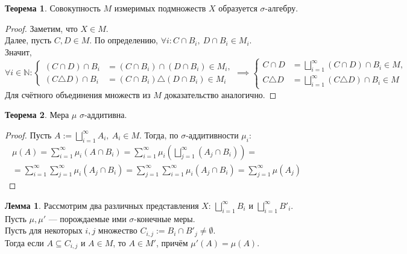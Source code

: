 \documentclass[11pt,a4paper]{report}
\def\Natural{\mathbb{N}}
\theoremstyle{definition}
\theoremstyle{definition}
\newtheorem{theorem}{Теорема}[section]
\newtheorem{lemma}{Лемма}[section]
\theoremstyle{definition}
\begin{document}
	\begin{theorem}
		Совокупность $ M $ измеримых подмножеств $ X $ образуется $ \sigma $-алгебру.
	\end{theorem}
	\begin{proof}
		Заметим, что $ X \in M $.\\
		Далее, пусть $ C, D \in M $. По определению, $ \forall i: C \cap B_{i},\ D \cap B_{i} \in M_{i} $.\\
		Значит, 
		\[\forall i \in \Natural:  
		\begin{cases} 
			(C \cap D) \cap B_{i} &= (C \cap B_{i}) \cap (D \cap B_{i}) \in M_{i},\\
			(C \triangle D) \cap B_{i} &= (C \cap B_{i}) \triangle (D \cap B_{i}) \in M_{i}
		\end{cases} \implies 
		\begin{cases}
			C \cap D &= \bigsqcup\limits_{i=1}^{\infty}{(C \cap D) \cap B_{i}} \in M,\\
			C \triangle D &= \bigsqcup\limits_{i=1}^{\infty}{(C \triangle D) \cap B_{i}} \in M
		\end{cases} \]
	 Для счётного объединения множеств из $ M $ доказательство аналогично.
	\end{proof}
	\begin{theorem}
		Мера $ \mu $ $ \sigma $-аддитивна.
	\end{theorem}
	\begin{proof}
		Пусть $ A := \bigsqcup\limits_{i=1}^{\infty}{A_{i}},\ A_{i} \in M $. Тогда, по $ \sigma $-аддитивности $ \mu_{i} $:
		\begin{gather*}
			\mu(A) = \sum_{i=1}^{\infty}\mu_{i}(A \cap B_{i}) = \sum_{i=1}^{\infty}\mu_{i}\left (\bigsqcup\limits_{j=1}^{\infty}{(A_{j} \cap B_{i})}\right ) =\\= \sum_{i=1}^{\infty}\sum\limits_{j=1}^{\infty}{\mu_{i}(A_{j} \cap B_{i})} = \sum_{j=1}^{\infty}\sum\limits_{i=1}^{\infty}{\mu_{i}(A_{j} \cap B_{i})} = \sum_{j=1}^{\infty}{\mu(A_{j})}
		\end{gather*}
	\end{proof}
	\begin{lemma}
		Рассмотрим два различных представления $ X $: $ \bigsqcup_{i=1}^{\infty}{B_{i}} $ и $ \bigsqcup_{i=1}^{\infty}{B'_{i}} $.\\
		Пусть $ \mu, \mu' $ — порождаемые ими $ \sigma $-конечные меры.\\ 
		Пусть для некоторых $ i, j $ множество $ C_{i, j} := B_{i} \cap B'_{j} \neq \emptyset $.\\ 
		Тогда если $ A \subseteq C_{i, j} $ и $ A \in M $, то $ A \in M' $, причём $ \mu'(A) = \mu(A) $.  
	\end{lemma}
\end{document}
